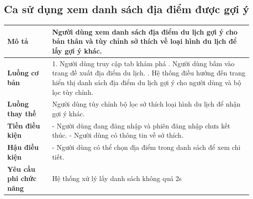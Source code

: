 \subsection{Ca sử dụng xem danh sách địa điểm được gợi ý}
\vspace{0.5cm}


\noindent 
\begin{tabularx}{\linewidth}{| l | X |} 
\hline 
\textbf{Mô tả} & Người dùng xem danh sách địa điểm du lịch gợi ý cho bản thân và tùy chỉnh sở thích về loại hình du lịch để lấy gợi ý khác.  \\ 
\hline 
\textbf{Luồng cơ bản} & 1. Người dùng truy cập tab khám phá  \newline
                        2. Người dùng bấm vào trang đề xuất địa điểm du lịch. \newline
                        3. Hệ thống điều hướng đến trang hiển thị danh sách địa điểm du lịch gợi ý cho người dùng và bộ lọc tùy chỉnh. \\
                     
\hline 
\textbf{Luồng thay thế} & Người dùng tùy chỉnh bộ lọc sở thích loại hình du lịch để nhận gợi ý khác.\\           
\hline 
\textbf{Tiền điều kiện} & - Người dùng đang đăng nhập và phiên đăng nhập chưa kết thúc. \newline
                          - Người dùng có thông tin về sở thích. \\
\hline 
\textbf{Hậu điều kiện} & - Người dùng có thể chọn địa điểm trong danh sách để xem chi tiết. \\

\hline 
\textbf{Yêu cầu phi chức năng} & Hệ thống xử lý lấy danh sách không quá 2s  \\ 
\hline 
\end{tabularx}

\vspace{0.8cm}

